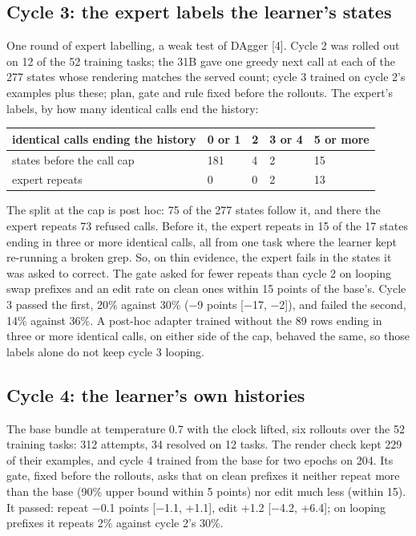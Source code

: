 \documentclass[
  11pt,
  a4paper,
]{article}
\begin{document}
\subsection{Cycle 3: the expert labels the learner's
states}\label{cycle-3-the-expert-labels-the-learners-states}

One round of expert labelling, a weak test of DAgger {[}4{]}. Cycle 2
was rolled out on 12 of the 52 training tasks; the 31B gave one greedy
next call at each of the 277 states whose rendering matches the served
count; cycle 3 trained on cycle 2's examples plus these; plan, gate and
rule fixed before the rollouts. The expert's labels, by how many
identical calls end the history:

\begin{longtable}[]{@{}lllll@{}}
\toprule\noalign{}
identical calls ending the history & 0 or 1 & 2 & 3 or 4 & 5 or more \\
\midrule\noalign{}
\endhead
\bottomrule\noalign{}
\endlastfoot
states before the call cap & 181 & 4 & 2 & 15 \\
expert repeats & 0 & 0 & 2 & 13 \\
\end{longtable}

The split at the cap is post hoc: 75 of the 277 states follow it, and
there the expert repeats 73 refused calls. Before it, the expert repeats
in 15 of the 17 states ending in three or more identical calls, all from
one task where the learner kept re-running a broken grep. So, on thin
evidence, the expert fails in the states it was asked to correct. The
gate asked for fewer repeats than cycle 2 on looping swap prefixes and
an edit rate on clean ones within 15 points of the base's. Cycle 3
passed the first, 20\% against 30\% (−9 points {[}−17, −2{]}), and
failed the second, 14\% against 36\%. A post-hoc adapter trained without
the 89 rows ending in three or more identical calls, on either side of
the cap, behaved the same, so those labels alone do not keep cycle 3
looping.

\subsection{Cycle 4: the learner's own
histories}\label{cycle-4-the-learners-own-histories}

The base bundle at temperature 0.7 with the clock lifted, six rollouts
over the 52 training tasks: 312 attempts, 34 resolved on 12 tasks. The
render check kept 229 of their examples, and cycle 4 trained from the
base for two epochs on 204. Its gate, fixed before the rollouts, asks
that on clean prefixes it neither repeat more than the base (90\% upper
bound within 5 points) nor edit much less (within 15). It passed: repeat
−0.1 points {[}−1.1, +1.1{]}, edit +1.2 {[}−4.2, +6.4{]}; on looping
prefixes it repeats 2\% against cycle 2's 30\%.
\end{document}
